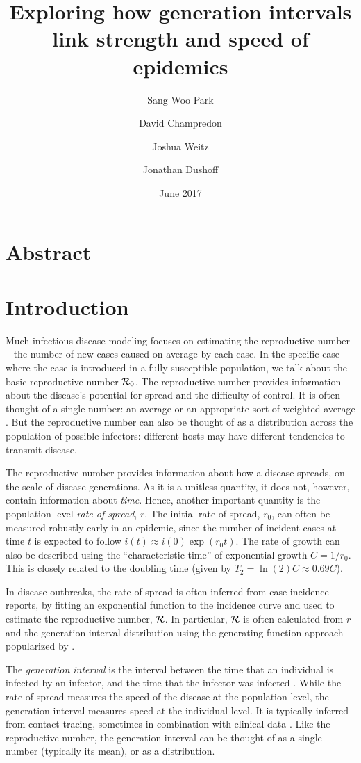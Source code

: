 \documentclass[12pt,]{article}
\title{Exploring how generation intervals link strength and speed of epidemics}
\author{Sang Woo Park \and David Champredon \and Joshua Weitz \and Jonathan Dushoff}
\date{June 2017}
\newcommand{\RR}{\ensuremath{{\cal R}}}
\newcommand{\Rx}[1]{\ensuremath{{\cal R}_{#1}}}
\newcommand{\Ro}{\Rx{0}}
\newcommand{\Tc}{\ensuremath{C}}
\begin{document}
\maketitle

\section*{Abstract}

\section{Introduction}

Much infectious disease modeling focuses on estimating the reproductive number -- the number of new cases caused on average by each case.
In the specific case where the case is introduced in a fully susceptible population, we talk about the basic reproductive number \Ro.
The reproductive number provides information about the disease's potential for spread and the difficulty of control.
It is often thought of a single number: an average \cite{AndeMay91} or an appropriate sort of weighted average \cite{DiekHees90}.
But the reproductive number can also be thought of as a distribution across the population of possible infectors: different hosts may have different tendencies to transmit disease.

The reproductive number provides information about how a disease spreads, on the scale of disease generations.
As it is a unitless quantity, it does not, however, contain information about \emph{time}.
Hence, another important quantity is the population-level \emph{rate of spread}, $r$. The initial rate of spread, $r_0$, can often be measured robustly early in an epidemic, since the number of incident cases at time $t$ is expected to follow $i(t) \approx i(0) \exp(r_0t)$. The rate of growth can also be described using the ``characteristic time'' of exponential growth $\Tc = 1/r_0$. This is closely related to the doubling time (given by $T_2 = \ln(2) \Tc \approx 0.69 \Tc$).

In disease outbreaks, the rate of spread is often inferred from case-incidence reports, by fitting an exponential function to the incidence curve \cite{MillRobi04, NishCast09, MaJDush14} and used to estimate the reproductive number, \RR.
In particular, $\RR$ is often calculated from $r$ and the generation-interval distribution using the generating function approach popularized by \cite{WallLips07}.

The \emph{generation interval} is the interval between the time that an individual is infected by an infector, and the time that the infector was infected \cite{Sven07}.
While the rate of spread measures the speed of the disease at the population level, the generation interval measures speed at the individual level.
It is typically inferred from contact tracing, sometimes in combination with clinical data \cite{GenerationMeasurement}.
Like the reproductive number, the generation interval can be thought of as a single number (typically its mean), or as a distribution.
\end{document}
